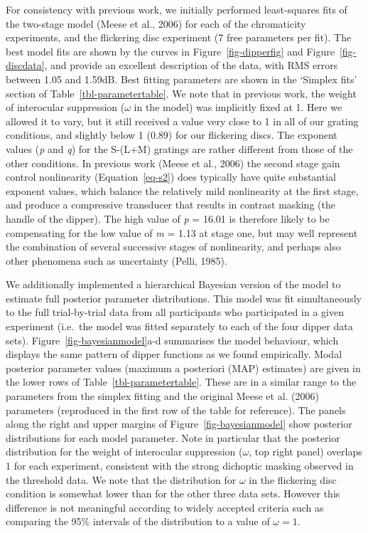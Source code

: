 \documentclass[
  letterpaper,
  DIV=11,
  numbers=noendperiod]{scrartcl}
\begin{document}
For consistency with previous work, we initially performed least-squares
fits of the two-stage model (Meese et al., 2006) for each of the
chromaticity experiments, and the flickering disc experiment (7 free
parameters per fit). The best model fits are shown by the curves in
Figure~\ref{fig-dipperfig} and Figure~\ref{fig-discdata}, and provide an
excellent description of the data, with RMS errors between 1.05 and
1.59dB. Best fitting parameters are shown in the `Simplex fits' section
of Table~\ref{tbl-parametertable}. We note that in previous work, the
weight of interocular suppression (\(\omega\) in the model) was
implicitly fixed at 1. Here we allowed it to vary, but it still received
a value very close to 1 in all of our grating conditions, and slightly
below 1 (0.89) for our flickering discs. The exponent values (\emph{p}
and \emph{q}) for the S-(L+M) gratings are rather different from those
of the other conditions. In previous work (Meese et al., 2006) the
second stage gain control nonlinearity (Equation~\ref{eq-s2}) does
typically have quite substantial exponent values, which balance the
relatively mild nonlinearity at the first stage, and produce a
compressive transducer that results in contrast masking (the handle of
the dipper). The high value of \emph{p} = 16.01 is therefore likely to
be compensating for the low value of \emph{m} = 1.13 at stage one, but
may well represent the combination of several successive stages of
nonlinearity, and perhaps also other phenomena such as uncertainty
(Pelli, 1985).

We additionally implemented a hierarchical Bayesian version of the model
to estimate full posterior parameter distributions. This model was fit
simultaneously to the full trial-by-trial data from all participants who
participated in a given experiment (i.e.~the model was fitted separately
to each of the four dipper data sets). Figure~\ref{fig-bayesianmodel}a-d
summarises the model behaviour, which displays the same pattern of
dipper functions as we found empirically. Modal posterior parameter
values (maximum a posteriori (MAP) estimates) are given in the lower
rows of Table~\ref{tbl-parametertable}. These are in a similar range to
the parameters from the simplex fitting and the original Meese et al.
(2006) parameters (reproduced in the first row of the table for
reference). The panels along the right and upper margins of
Figure~\ref{fig-bayesianmodel} show posterior distributions for each
model parameter. Note in particular that the posterior distribution for
the weight of interocular suppression (\(\omega\), top right panel)
overlaps 1 for each experiment, consistent with the strong dichoptic
masking observed in the threshold data. We note that the distribution
for \(\omega\) in the flickering disc condition is somewhat lower than
for the other three data sets. However this difference is not meaningful
according to widely accepted criteria such as comparing the 95\%
intervals of the distribution to a value of \(\omega=1\).
\end{document}
